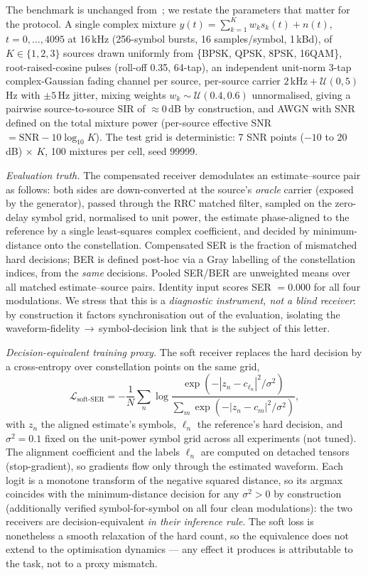 \documentclass[journal]{IEEEtran}
\newcommand{\snr}{\mathrm{SNR}}
\begin{document}
The benchmark is unchanged from~\cite{nong2026openworld}; we restate
the parameters that matter for the protocol. A single complex mixture
$y(t) = \sum_{k=1}^{K} w_k s_k(t) + n(t)$, $t = 0,\dots,4095$ at
16\,kHz (256-symbol bursts, 16 samples/symbol, 1\,kBd), of
$K \in \{1,2,3\}$ sources drawn uniformly from
\{BPSK, QPSK, 8PSK, 16QAM\}, root-raised-cosine pulses (roll-off 0.35,
64-tap), an independent unit-norm 3-tap complex-Gaussian fading channel
per source, per-source carrier $2\,$kHz${}+\mathcal{U}(0,5)$\,Hz with
$\pm 5$\,Hz jitter, mixing weights $w_k \sim \mathcal{U}(0.4,0.6)$
unnormalised, giving a pairwise source-to-source SIR of
$\approx 0$\,dB by construction, and AWGN
with SNR defined on the total mixture power (per-source effective SNR
$= \snr - 10\log_{10}K$). The test grid is deterministic: 7 SNR points
($-10$ to $20$\,dB) $\times$ $K$, 100 mixtures per cell, seed 99999.

\emph{Evaluation truth.} The compensated receiver demodulates an
estimate--source pair as follows: both sides are down-converted at the
source's \emph{oracle} carrier (exposed by the generator), passed
through the RRC matched filter, sampled on the zero-delay symbol grid,
normalised to unit power, the estimate phase-aligned to the reference
by a single least-squares complex coefficient, and decided by
minimum-distance onto the constellation. Compensated SER is the
fraction of mismatched hard decisions; BER is defined post-hoc via a
Gray labelling of the constellation indices, from the \emph{same}
decisions. Pooled SER/BER are unweighted means over all matched
estimate--source pairs. Identity input scores SER $= 0.000$ for all
four modulations. We stress that this is a \emph{diagnostic instrument, not
a blind receiver}: by construction it factors synchronisation out of
the evaluation, isolating the waveform-fidelity$\,\to\,$symbol-decision
link that is the subject of this letter.

\emph{Decision-equivalent training proxy.} The soft receiver replaces
the hard decision by a cross-entropy over constellation points on the
same grid,
\begin{equation}
  \mathcal{L}_{\mathrm{soft\text{-}SER}}
  = -\frac{1}{N}\sum_{n}\log
  \frac{\exp(-|z_n - c_{\ell_n}|^2/\sigma^2)}
        {\sum_{m}\exp(-|z_n - c_m|^2/\sigma^2)},
  \label{eq:softser}
\end{equation}
with $z_n$ the aligned estimate's symbols, $\ell_n$ the reference's
hard decision, and $\sigma^2 = 0.1$ fixed on the unit-power symbol grid
across all experiments (not tuned). The alignment coefficient and the
labels $\ell_n$ are computed on detached tensors (stop-gradient), so
gradients flow only through the estimated waveform. Each logit is a
monotone transform of the negative squared distance, so its argmax
coincides with the minimum-distance decision for any $\sigma^2 > 0$ by
construction (additionally verified symbol-for-symbol on all four clean
modulations): the two receivers are decision-equivalent \emph{in their
inference rule}. The soft loss is
nonetheless a smooth relaxation of the hard count, so the equivalence
does not extend to the optimisation dynamics --- any effect it produces
is attributable to the task, not to a proxy mismatch.
\end{document}
